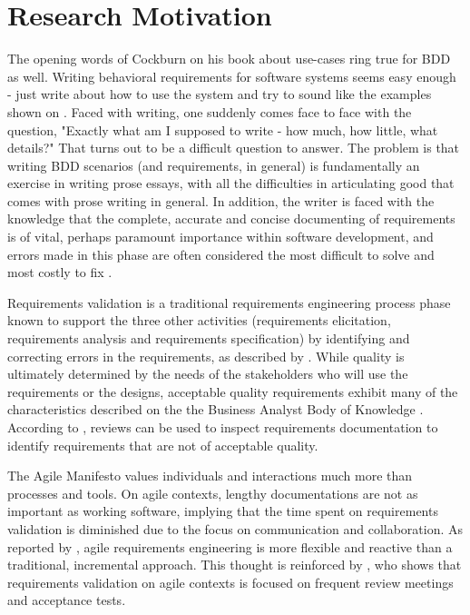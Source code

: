 \chapter{\label{chap:chap2}{Research Motivation}}

The opening words of Cockburn on his book about use-cases \cite{Cockburn_2000} ring true for BDD as well. Writing behavioral requirements for software systems seems easy enough - just write about how to use the system and try to sound like the examples shown on \cite{Smart_2014}. Faced with writing, one suddenly comes face to face with the question, "Exactly what am I supposed to write - how much, how little, what details?" That turns out to be a difficult question to answer. The problem is that writing BDD scenarios (and requirements, in general) is fundamentally an exercise in writing prose essays, with all the difficulties in articulating good that comes with prose writing in general. In addition, the writer is faced with the knowledge that the complete, accurate and concise documenting of requirements is of vital, perhaps paramount importance within software development, and errors made in this phase are often considered the most difficult to solve and most costly to fix \cite{Phalp_2011}.

Requirements validation is a traditional requirements engineering process phase known to support the three other activities (requirements elicitation, requirements analysis and requirements specification) by identifying and correcting errors in the requirements, as described by \cite{Heikkila_2015}. While quality is ultimately determined by the needs of the stakeholders who will use the requirements or the designs, acceptable quality requirements exhibit many of the characteristics described on the the Business Analyst Body of Knowledge \cite{Babok_2009} \cite{Babok_2015}. According to \cite{Babok_2015}, reviews can be used to inspect requirements documentation to identify requirements that are not of acceptable quality. 

The Agile Manifesto \cite{Agile_Manifesto_2001} values individuals and interactions much more than processes and tools. On agile contexts, lengthy documentations are not as important as working software, implying that the time spent on requirements validation is diminished due to the focus on communication and collaboration. As reported by \cite{Heikkila_2015}, agile requirements engineering is more flexible and reactive than a traditional, incremental approach. This thought is reinforced by \cite{Paetsch_2003}, who shows that requirements validation on agile contexts is focused on frequent review meetings and acceptance tests. 

